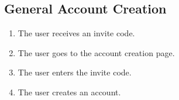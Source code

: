\subsection{General Account Creation}

\begin{enumerate}
    \item The user receives an invite code.
    \item The user goes to the account creation page.
    \item The user enters the invite code.
    \item The user creates an account.
\end{enumerate}

